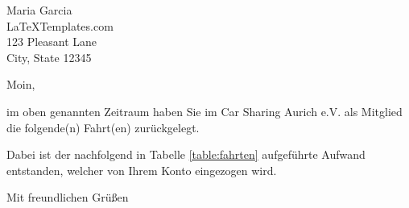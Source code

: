 \documentclass[
	pagenumber=false, %
	parskip=half, %
	fromalign=right, %
	foldmarks=true, %
	addrfield=true %
	firstfoot=on %
    ]{scrlttr2}
\date{5. August 2017} %
\begin{document}
 
\begin{letter}{Maria Garcia \\ LaTeXTemplates.com \\ 123 Pleasant Lane \\ City, State 12345} %


\opening{Moin,}

im oben genannten Zeitraum haben Sie im Car Sharing Aurich e.V. als Mitglied die folgende(n) Fahrt(en) zurückgelegt.

Dabei ist der nachfolgend in Tabelle \ref{table:fahrten} aufgeführte Aufwand entstanden, welcher von Ihrem Konto eingezogen wird.

\closing{Mit freundlichen Grüßen}




\end{letter}
\end{document}
